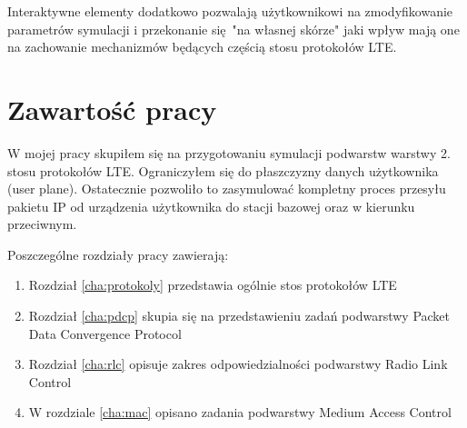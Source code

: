 Interaktywne elementy dodatkowo pozwalają użytkownikowi na zmodyfikowanie parametrów symulacji i przekonanie się "na własnej skórze" jaki wpływ mają one na zachowanie mechanizmów będących częścią stosu protokołów LTE.

\section{Zawartość pracy}
\label{sec:zawartoscPracy}

W mojej pracy skupiłem się na przygotowaniu symulacji podwarstw warstwy 2. stosu protokołów LTE. Ograniczyłem się do płaszczyzny danych użytkownika (user plane). Ostatecznie pozwoliło to zasymulować kompletny proces przesyłu pakietu IP od urządzenia użytkownika do stacji bazowej oraz w kierunku przeciwnym.

Poszczególne rozdziały pracy zawierają:

\begin{enumerate}%

\item Rozdział \ref{cha:protokoly} przedstawia ogólnie stos protokołów LTE
\item Rozdział \ref{cha:pdcp} skupia się na przedstawieniu zadań podwarstwy Packet Data Convergence Protocol
\item Rozdział \ref{cha:rlc} opisuje zakres odpowiedzialności podwarstwy Radio Link Control
\item W rozdziale \ref{cha:mac} opisano zadania podwarstwy Medium Access Control

\end{enumerate}
